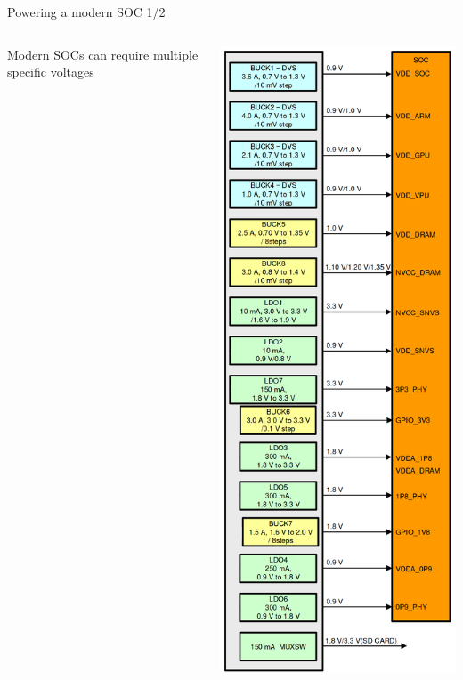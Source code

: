 \documentclass[10pt]{beamer}
\begin{document}
\begin{frame}[t]{Powering a modern SOC 1/2}\vspace{4pt}
	\begin{columns}[onlytextwidth]

	 Modern SOCs can require multiple specific voltages

	\includegraphics[width=0.4\linewidth]{img/imx8_power.png}
	\end{columns}

\end{frame}
\end{document}

